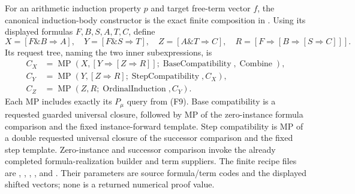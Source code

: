 For an arithmetic induction property $p$ and target free-term vector
$f$, the canonical induction-body constructor is the exact finite
composition in .
Using its displayed formulas $F,B,S,A,T,C$, define
\[
 X=[F\mathbin\&B\Rightarrow A],\quad
 Y=[F\mathbin\&S\Rightarrow T],\quad
 Z=[A\mathbin\&T\Rightarrow C],\quad
 R=[F\Rightarrow[B\Rightarrow[S\Rightarrow C]]].
\]
Its request tree, naming the two inner subexpressions, is
\begin{align*}
 C_X&=\operatorname{MP}(X,[Y\Rightarrow[Z\Rightarrow R]];
          \operatorname{BaseCompatibility},\operatorname{Combine}),\\
 C_Y&=\operatorname{MP}(Y,[Z\Rightarrow R];
          \operatorname{StepCompatibility},C_X),\\
 C_Z&=\operatorname{MP}(Z,R;\operatorname{OrdinalInduction},C_Y).
 \tag{F13}
\end{align*}
Each MP includes exactly its $P_\mu$ query from (F9).
Base compatibility is a requested guarded universal closure,
followed by MP of the zero-instance formula comparison and the fixed
instance-forward template.  Step compatibility is MP of a double
requested universal closure of the successor comparison and the
fixed step template.  Zero-instance and successor comparison invoke
the already completed formula-realization builder and term
suppliers.  The finite recipe files are
,
,
,
, and
.
Their parameters are source formula/term codes and the displayed
shifted vectors; none is a returned numerical proof value.


